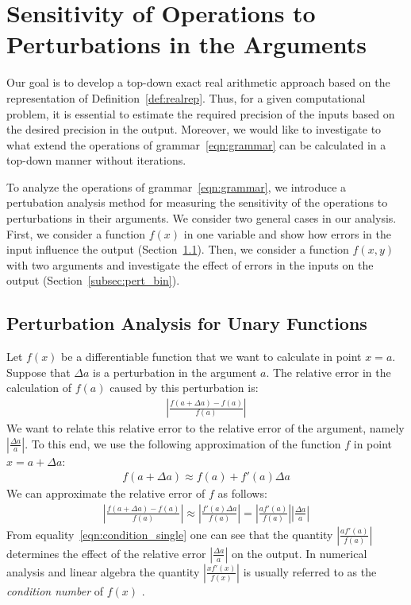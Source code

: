 \documentclass{article}
\newcommand{\dx}{\Delta a}
\numberwithin{mytheorem}{section}
\begin{document}
\section{Sensitivity of Operations to Perturbations in the Arguments}\label{sec:condition}
Our goal is to develop a top-down exact real arithmetic approach based on the representation of Definition~\ref{def:realrep}. Thus, for a given computational problem, it is essential to estimate the required precision of the inputs based on the desired precision in the output. Moreover, we would like to investigate to what extend the operations of  grammar~\eqref{eqn:grammar} can be calculated in a top-down manner without iterations. 

To analyze the operations of grammar~\eqref{eqn:grammar}, we introduce a pertubation analysis method for measuring the sensitivity of the operations to perturbations in their arguments. We consider two general cases in our analysis. First, we consider a function $f(x)$ in one variable and show how errors in the input influence the output (Section~\ref{subsec:pert_unary}). Then, we consider a function $f(x,y)$ with two arguments and investigate the effect of errors in the inputs on the output (Section~\ref{subsec:pert_bin}).


\subsection{Perturbation Analysis for Unary Functions}\label{subsec:pert_unary}
Let $f(x)$ be a differentiable function that we want to calculate in point $x=a$. Suppose that $\dx$ is a perturbation in the argument $a$. The relative error in the calculation of $f(a)$ caused by this perturbation is:
\begin{align*}
|\frac{f(a+\dx)-f(a)}{f(a)}|
\end{align*}
We want to relate this relative error to the relative error of the argument, namely $|\frac{\dx}{a}|$. To this end, we use the following approximation of the function $f$ in point $x=a+\dx$:
\begin{align*}
f(a+\dx)\approx f(a)+f'(a)\dx
\end{align*}
We can approximate the relative error of $f$ as follows:
\begin{align}
|\frac{f(a+\dx)-f(a)}{f(a)}|\approx |\frac{f'(a)\dx}{f(a)}|=|\frac{af'(a)}{f(a)}||\frac{\dx}{a}|\label{eqn:condition_single}
\end{align}
From equality~\eqref{eqn:condition_single} one can see that the quantity $|\frac{af'(a)}{f(a)}|$ determines the effect of the relative error $|\frac{\dx}{a}|$ on the output. In numerical analysis and linear algebra the quantity $|\frac{xf'(x)}{f(x)}|$ is usually referred to as the \textit{condition number} of $f(x)$ \cite{H02,H08}.
\end{document}
